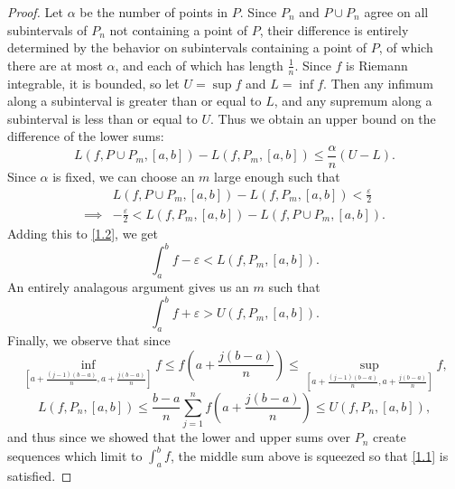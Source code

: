 \documentclass[12pt]{article}
\theoremstyle{definition}
\begin{document}
\begin{proof}
	Let $\alpha$ be the number of points in $P$.
	Since $P_n$ and $P \cup P_n$ agree on all subintervals of $P_n$ not containing a point of $P$, their difference is entirely determined by the behavior on subintervals containing a point of $P$, of which there are at most $\alpha$, and each of which has length $\frac{1}{n}$.
	Since $f$ is Riemann integrable, it is bounded, so let $U = \sup f$ and $L = \inf f$.
	Then any infimum along a subinterval is greater than or equal to $L$, and any supremum along a subinterval is less than or equal to $U$.
	Thus we obtain an upper bound on the difference of the lower sums: \begin{equation*}
		L(f, P \cup P_m, [a,b]) - L(f, P_m, [a,b]) \leq \frac{\alpha}{n}(U - L).
	\end{equation*}
	Since $\alpha$ is fixed, we can choose an $m$ large enough such that \begin{align*}
		         & L(f, P \cup P_m, [a, b]) - L(f, P_m, [a, b]) < \frac{\varepsilon}{2}    \\
		\implies & - \frac{\varepsilon}{2} < L(f, P_m, [a, b]) - L(f, P \cup P_m, [a, b]).
	\end{align*}
	Adding this to \eqref{1.2}, we get \begin{equation*}
		\int_a^b f - \varepsilon < L(f, P_m, [a, b]).
	\end{equation*}
	An entirely analagous argument gives us an $m$ such that \begin{equation*}
		\int_a^b f + \varepsilon > U(f, P_m, [a, b]).
	\end{equation*}
	Finally, we observe that since \begin{equation*}
		\inf_{\left[a + \frac{(j-1)(b-a)}{n}, a + \frac{j(b-a)}{n}\right]} f \leq f \left( a + \frac{j(b-a)}{n} \right) \leq \sup_{\left[ a + \frac{(j-1)(b-a)}{n}, a + \frac{j(b-a)}{n} \right]} f,
	\end{equation*}
	\begin{equation*}
		L(f, P_n, [a, b]) \leq \frac{b-a}{n} \sum_{j=1}^n f \left( a + \frac{j(b-a)}{n} \right) \leq U(f, P_n, [a,b]),
	\end{equation*}
	and thus since we showed that the lower and upper sums over $P_n$ create sequences which limit to $\int_a^b f$, the middle sum above is squeezed so that \eqref{1.1} is satisfied.
\end{proof}
\end{document}
